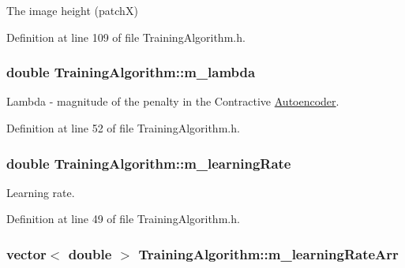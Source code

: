 The image height (patchX) 



Definition at line 109 of file Training\+Algorithm.\+h.

\subsubsection[{\texorpdfstring{m\+\_\+lambda}{m_lambda}}]{\setlength{\rightskip}{0pt plus 5cm}double Training\+Algorithm\+::m\+\_\+lambda\hspace{0.3cm}{\ttfamily [private]}}\hypertarget{classTrainingAlgorithm_a774f82d6c26effaa909c40c9e24b8e48}{}\label{classTrainingAlgorithm_a774f82d6c26effaa909c40c9e24b8e48}


Lambda -\/ magnitude of the penalty in the Contractive \hyperlink{classAutoencoder}{Autoencoder}. 



Definition at line 52 of file Training\+Algorithm.\+h.

\subsubsection[{\texorpdfstring{m\+\_\+learning\+Rate}{m_learningRate}}]{\setlength{\rightskip}{0pt plus 5cm}double Training\+Algorithm\+::m\+\_\+learning\+Rate\hspace{0.3cm}{\ttfamily [private]}}\hypertarget{classTrainingAlgorithm_abcc97ba6220839e3f24a5692e8fdd2b3}{}\label{classTrainingAlgorithm_abcc97ba6220839e3f24a5692e8fdd2b3}


Learning rate. 



Definition at line 49 of file Training\+Algorithm.\+h.

\subsubsection[{\texorpdfstring{m\+\_\+learning\+Rate\+Arr}{m_learningRateArr}}]{\setlength{\rightskip}{0pt plus 5cm}vector$<$ double $>$ Training\+Algorithm\+::m\+\_\+learning\+Rate\+Arr\hspace{0.3cm}{\ttfamily [private]}}\hypertarget{classTrainingAlgorithm_a906835e7f43946669af7137eb982d237}{}\label{classTrainingAlgorithm_a906835e7f43946669af7137eb982d237}


